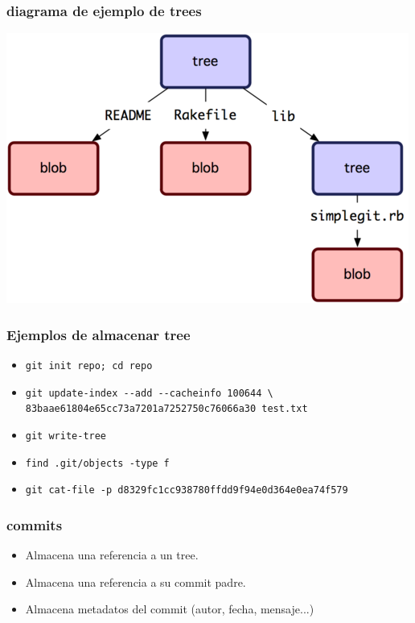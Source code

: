 \documentclass[10pt]{beamer}
\begin{document}
  \begin{frame}[containsverbatim]
    \frametitle{diagrama de ejemplo de trees}
    \begin{center}\includegraphics{trees.png}\end{center}
  \end{frame}

  \begin{frame}[containsverbatim]
    \frametitle{Ejemplos de almacenar tree}
    \begin{itemize}
        \item \verb$git init repo; cd repo$
        \item \verb$git update-index --add --cacheinfo 100644 \$ \verb$83baae61804e65cc73a7201a7252750c76066a30 test.txt$
        \item \verb$git write-tree$
        \item \verb$find .git/objects -type f$
        \item \verb$git cat-file -p d8329fc1cc938780ffdd9f94e0d364e0ea74f579$
    \end{itemize}
  \end{frame}

  \begin{frame}[containsverbatim]
    \frametitle{commits}
    \begin{itemize}
        \item Almacena una referencia a un tree.
        \item Almacena una referencia a su commit padre.
        \item Almacena metadatos del commit (autor, fecha, mensaje...)
    \end{itemize}
  \end{frame}
\end{document}
